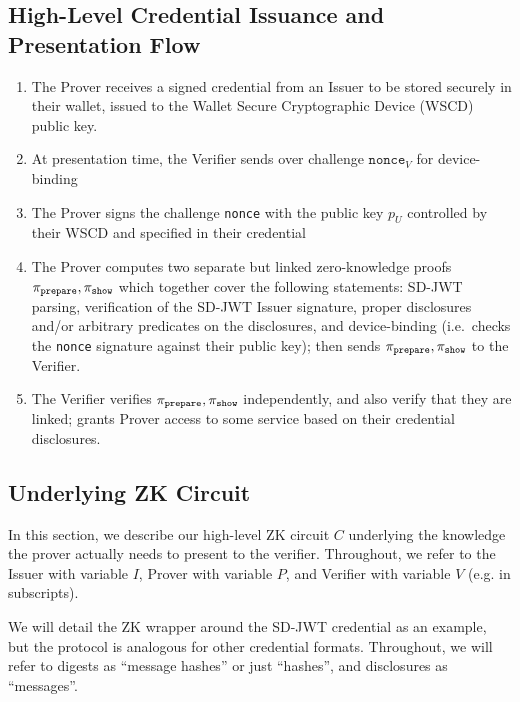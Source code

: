 \subsection{High-Level Credential Issuance and Presentation Flow}\label{sec:high-level-flow}

\begin{enumerate}
\item The Prover receives a signed credential from an Issuer to be stored securely in their wallet, issued to the Wallet Secure Cryptographic Device (WSCD) public key.
\item At presentation time, the Verifier sends over challenge $\texttt{nonce}_V$ for device-binding
\item The Prover signs the challenge \texttt{nonce} with the public key $p_U$ controlled by their WSCD and specified in their credential
\item The Prover computes two separate but linked zero-knowledge proofs $\pi_{\text{\texttt{prepare}}}, \pi_{\text{\texttt{show}}}$ which together cover the following statements: SD-JWT parsing, verification of the SD-JWT Issuer signature, 
proper disclosures and/or arbitrary predicates on the disclosures, and device-binding 
(i.e.\ checks the \texttt{nonce} signature against their public key); then sends $\pi_{\text{\texttt{prepare}}}, \pi_{\text{\texttt{show}}}$ to the Verifier.
\item The Verifier verifies $\pi_{\text{\texttt{prepare}}}, \pi_{\text{\texttt{show}}}$ independently, and also verify that they are linked; grants Prover access to some service based on their credential disclosures.
\end{enumerate}

\subsection{Underlying ZK Circuit}

In this section, we describe our high-level ZK circuit $C$ underlying the knowledge the prover actually needs to present to the verifier.
Throughout, we refer to the Issuer with variable $I$, Prover with variable $P$, and Verifier with variable $V$ (e.g. in subscripts). 

We will detail the ZK wrapper around the SD-JWT credential as an example, but the protocol is analogous for other credential formats. 
Throughout, we will refer to digests as ``message hashes'' or just ``hashes'', and disclosures as ``messages''.

